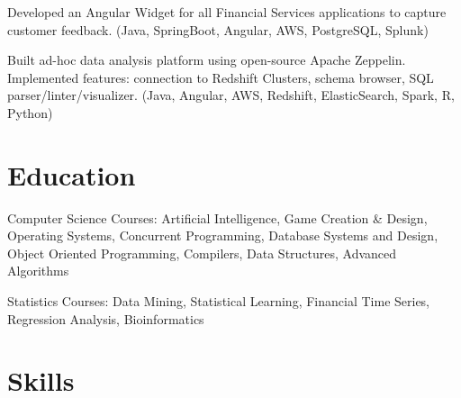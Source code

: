\documentclass[letterpaper]{deedy-resume-openfont} %
\begin{document}
\sectionsep %


\begin{tightemize}
\item Developed an Angular Widget for all Financial Services applications to capture customer feedback. (Java, SpringBoot, Angular, AWS, PostgreSQL, Splunk)
\item Built ad-hoc data analysis platform using open-source Apache Zeppelin. Implemented features: connection to Redshift Clusters, schema browser, SQL parser/linter/visualizer. (Java, Angular, AWS, Redshift, ElasticSearch, Spark, R, Python)
\end{tightemize}

\sectionsep %

\sectionsep
\sectionsep
\section{Education}
\sectionheadersep


\begin{tightemize}
\item Computer Science Courses: Artificial Intelligence, Game Creation \& Design, Operating Systems, Concurrent Programming, Database Systems and Design, Object Oriented Programming, Compilers, Data Structures, Advanced Algorithms
\item Statistics Courses: Data Mining, Statistical Learning, Financial Time Series, Regression Analysis, Bioinformatics
\end{tightemize}

\sectionsep %
\sectionsep %


\section{Skills}
\sectionheadersep
\end{document}
